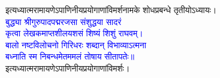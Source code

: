 \vspace{4mm}
\centering इत्यध्यात्म\-रामायणेऽपाणिनीय\-प्रयोगाणां\-विमर्श\-नामके शोध\-प्रबन्धे तृतीयोऽध्यायः।\\
\vspace{4mm}
\centering\textcolor{blue}{\fontsize{16}{24}\selectfont बुद्ध्या श्रीगुरुपादपद्मरजसा संशुद्धया सादरं\nopagebreak\\
कृत्वा लेखकमाप्तशीलयशसं शिष्यं शिशुं राघवम्।\nopagebreak\\
बालो नष्टविलोचनो गिरिधरः शब्दान् विभाव्याऽत्मना\nopagebreak\\
बध्नाति स्म निबन्धमेतममलं तोषाय सीतापतेः॥}\nopagebreak\\
\vspace{4mm}
\centering इत्यध्यात्म\-रामायणेऽपाणिनीय\-प्रयोगाणां\-विमर्शः।
